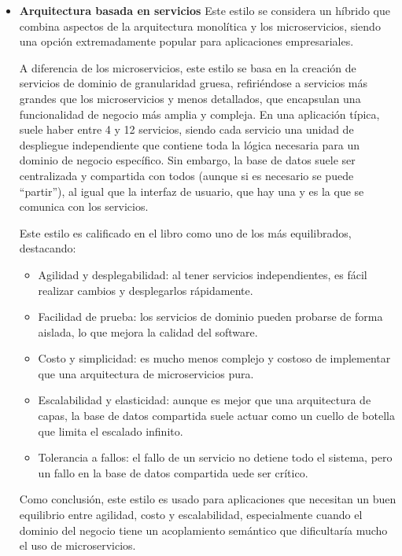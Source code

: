 \begin{itemize}
    \item \textbf{Arquitectura basada en servicios}
    \newline
    Este estilo se considera un híbrido que combina aspectos de la arquitectura monolítica y los microservicios, siendo 
    una opción extremadamente popular para aplicaciones empresariales. 

    A diferencia de los microservicios, este estilo se basa en la creación de servicios de dominio de granularidad gruesa, 
    refiriéndose a servicios más grandes que los microservicios y menos detallados, que encapsulan una funcionalidad de negocio 
    más amplia y compleja. En una aplicación típica, suele haber entre 4 y 12 servicios, siendo cada servicio una unidad de 
    despliegue independiente que contiene toda la lógica necesaria para un dominio de negocio específico. Sin embargo, la base 
    de datos suele ser centralizada y compartida con todos (aunque si es necesario se puede ``partir''), al igual que la interfaz 
    de usuario, que hay una y es la que se comunica con los servicios.

    Este estilo es calificado en el libro como uno de los más equilibrados, destacando:

    \begin{itemize}
        \item Agilidad y desplegabilidad: al tener servicios independientes, es fácil realizar cambios y desplegarlos 
        rápidamente.
        \item Facilidad de prueba: los servicios de dominio pueden probarse de forma aislada, lo que mejora la calidad 
        del software.
        \item Costo y simplicidad: es mucho menos complejo y costoso de implementar que una arquitectura de microservicios pura.
        \item Escalabilidad y elasticidad: aunque es mejor que una arquitectura de capas, la base de datos compartida suele actuar 
        como un cuello de botella que limita el escalado infinito.
        \item Tolerancia a fallos: el fallo de un servicio no detiene todo el sistema, pero un fallo en la base de datos compartida 
        uede ser crítico.
    \end{itemize}

    Como conclusión, este estilo es usado para aplicaciones que necesitan un buen equilibrio entre agilidad, costo y escalabilidad, 
    especialmente cuando el dominio del negocio tiene un acoplamiento semántico que dificultaría mucho el uso de microservicios.


\end{itemize}
